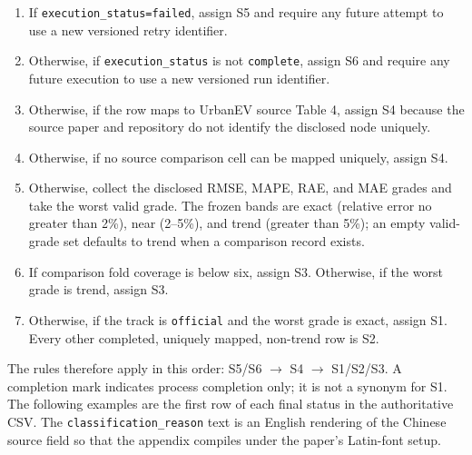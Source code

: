 \begin{enumerate}[label=\textbf{D\arabic*.}]
    \item If \texttt{execution\_status=failed}, assign S5 and require any future attempt to use a new versioned retry identifier.
    \item Otherwise, if \texttt{execution\_status} is not \texttt{complete}, assign S6 and require any future execution to use a new versioned run identifier.
    \item Otherwise, if the row maps to UrbanEV source Table 4, assign S4 because the source paper and repository do not identify the disclosed node uniquely.
    \item Otherwise, if no source comparison cell can be mapped uniquely, assign S4.
    \item Otherwise, collect the disclosed RMSE, MAPE, RAE, and MAE grades and take the worst valid grade.  The frozen bands are exact (relative error no greater than 2\%), near (2--5\%), and trend (greater than 5\%); an empty valid-grade set defaults to trend when a comparison record exists.
    \item If comparison fold coverage is below six, assign S3.  Otherwise, if the worst grade is trend, assign S3.
    \item Otherwise, if the track is \texttt{official} and the worst grade is exact, assign S1.  Every other completed, uniquely mapped, non-trend row is S2.
\end{enumerate}

The rules therefore apply in this order: S5/S6 $\rightarrow$ S4 $\rightarrow$ S1/S2/S3.  A completion mark indicates process completion only; it is not a synonym for S1.  The following examples are the first row of each final status in the authoritative CSV.  The \texttt{classification\_reason} text is an English rendering of the Chinese source field so that the appendix compiles under the paper's Latin-font setup.

